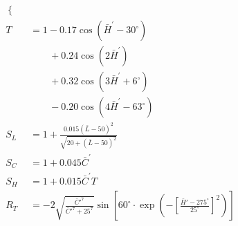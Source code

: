 \documentclass[12pt,twoside,notitlepage]{report}
\begin{document}
\begin{align}
\begin{cases}
\end{cases} \\
T &= 1 - 0.17 \cos ( \bar{H}^\prime - 30^\circ )\nonumber\\
&\qquad+ 0.24 \cos (2\bar{H}^\prime)\nonumber\\
&\qquad+ 0.32 \cos (3\bar{H}^\prime + 6^\circ )\nonumber\\
&\qquad- 0.20 \cos (4\bar{H}^\prime - 63^\circ) \\
S_L &= 1 + \frac{0.015 \left( \bar{L} - 50 \right)^2}{\sqrt{20 + {\left(\bar{L} - 50 \right)}^2} } \\
S_C &= 1+0.045 \bar{C}^\prime \\
S_H &= 1+0.015 \bar{C}^\prime T \\
R_T &= -2 \sqrt{\frac{\bar{C}'^7}{\bar{C}'^7+25^7}} \sin \left[ 60^\circ \cdot \exp \left( -\left[ \frac{\bar{H}'-275^\circ}{25^\circ} \right]^2 \right) \right]
\end{align}
\end{document}
